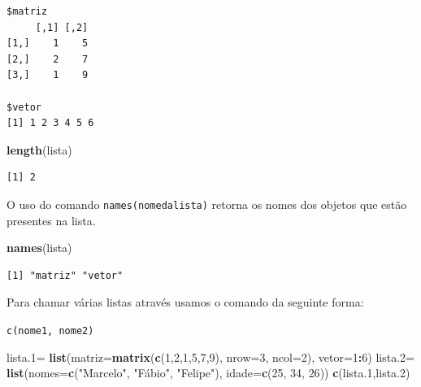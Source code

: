 \documentclass[12pt,brazil,oneside]{book}
\newenvironment{Shaded}{\begin{snugshade}}{\end{snugshade}}
\newcommand{\DataTypeTok}[1]{\textcolor[rgb]{0.13,0.29,0.53}{#1}}
\newcommand{\DecValTok}[1]{\textcolor[rgb]{0.00,0.00,0.81}{#1}}
\newcommand{\FloatTok}[1]{\textcolor[rgb]{0.00,0.00,0.81}{#1}}
\newcommand{\KeywordTok}[1]{\textcolor[rgb]{0.13,0.29,0.53}{\textbf{#1}}}
\newcommand{\NormalTok}[1]{#1}
\newcommand{\OperatorTok}[1]{\textcolor[rgb]{0.81,0.36,0.00}{\textbf{#1}}}
\newcommand{\StringTok}[1]{\textcolor[rgb]{0.31,0.60,0.02}{#1}}
\begin{document}
\begin{verbatim}
$matriz
     [,1] [,2]
[1,]    1    5
[2,]    2    7
[3,]    1    9

$vetor
[1] 1 2 3 4 5 6
\end{verbatim}

\begin{Shaded}
\begin{Highlighting}[]
\KeywordTok{length}\NormalTok{(lista)}
\end{Highlighting}
\end{Shaded}

\begin{verbatim}
[1] 2
\end{verbatim}

O uso do comando \texttt{names(nomedalista)} retorna os nomes dos objetos que estão presentes na lista.

\begin{Shaded}
\begin{Highlighting}[]
\KeywordTok{names}\NormalTok{(lista)}
\end{Highlighting}
\end{Shaded}

\begin{verbatim}
[1] "matriz" "vetor" 
\end{verbatim}

Para chamar várias listas através usamos o comando da seguinte forma:

\texttt{c(nome1,\ nome2)}

\begin{Shaded}
\begin{Highlighting}[]
\NormalTok{lista}\FloatTok{.1}\NormalTok{=}\StringTok{ }\KeywordTok{list}\NormalTok{(}\DataTypeTok{matriz=}\KeywordTok{matrix}\NormalTok{(}\KeywordTok{c}\NormalTok{(}\DecValTok{1}\NormalTok{,}\DecValTok{2}\NormalTok{,}\DecValTok{1}\NormalTok{,}\DecValTok{5}\NormalTok{,}\DecValTok{7}\NormalTok{,}\DecValTok{9}\NormalTok{), }\DataTypeTok{nrow=}\DecValTok{3}\NormalTok{, }\DataTypeTok{ncol=}\DecValTok{2}\NormalTok{),}
              \DataTypeTok{vetor=}\DecValTok{1}\OperatorTok{:}\DecValTok{6}\NormalTok{)}
\NormalTok{lista}\FloatTok{.2}\NormalTok{=}\StringTok{ }\KeywordTok{list}\NormalTok{(}\DataTypeTok{nomes=}\KeywordTok{c}\NormalTok{(}\StringTok{"Marcelo"}\NormalTok{, }\StringTok{"Fábio"}\NormalTok{, }\StringTok{"Felipe"}\NormalTok{), }
              \DataTypeTok{idade=}\KeywordTok{c}\NormalTok{(}\DecValTok{25}\NormalTok{, }\DecValTok{34}\NormalTok{, }\DecValTok{26}\NormalTok{))}
\KeywordTok{c}\NormalTok{(lista}\FloatTok{.1}\NormalTok{,lista}\FloatTok{.2}\NormalTok{)}
\end{Highlighting}
\end{Shaded}
\end{document}
